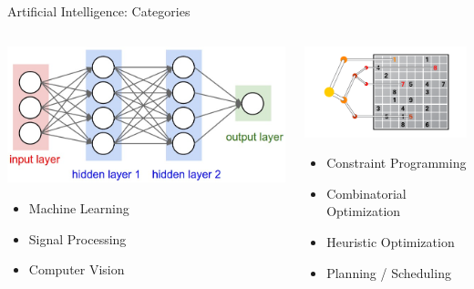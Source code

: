 \begin{frame}{Artificial Intelligence: Categories}
\begin{columns}[onlytextwidth,T]
    
    \begin{column}{.5\textwidth}
          
    \begin{center}
    \includegraphics[width=.8\textwidth]{img/neuralnet.jpg}
    \end{center}

    \vspace*{4ex}
    
    \begin{itemize}
    \item Machine Learning
    \item Signal Processing
    \item Computer Vision
    \end{itemize}

    \end{column}
    
    \begin{column}{.5\textwidth}
    \begin{center}
    \includegraphics[width=.9\textwidth]{img/discreteopt.png}
    \end{center}
    \begin{itemize}
    \item Constraint Programming
    \item Combinatorial Optimization
    \item Heuristic Optimization
    \item Planning / Scheduling
    \end{itemize}
    
    \end{column}
  \end{columns}
\end{frame}
%


